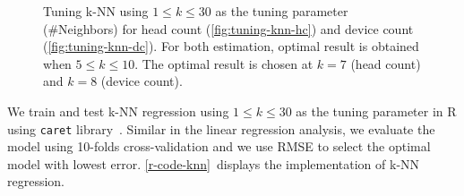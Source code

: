 	\begin{figure}[H]
		\begin{adjustwidth}{-1cm}{}
		\centering
		\end{adjustwidth}
		\caption[Tuning \ac{k-NN}.]
		{Tuning \ac{k-NN} using $1 \le k \le 30$ as the tuning parameter (\#Neighbors) for head count (\ref{fig:tuning-knn-hc}) and device count (\ref{fig:tuning-knn-dc}). For both estimation, optimal result is obtained when $5 \le k \le 10$. The optimal result is chosen at $k=7$ (head count) and $k=8$ (device count).}
		\label{fig:tuning-knn}
	\end{figure}

	We train and test \ac{k-NN} regression using $1 \le k \le 30$ as the tuning parameter in R using \verb|caret| library~\cite{caret}. Similar in the linear regression analysis, we evaluate the model using 10-folds cross-validation and we use \ac{RMSE} to select the optimal model with lowest error. \autoref{r-code-knn}~displays the implementation of \ac{k-NN} regression.


